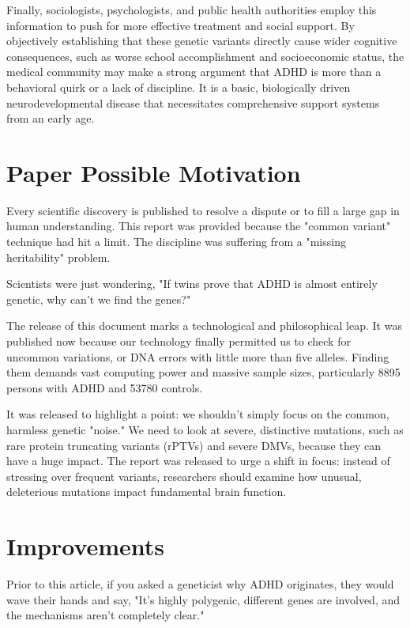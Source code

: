 Finally, sociologists, psychologists, and public health authorities employ this information to push for more effective treatment and social support. 
By objectively establishing that these genetic variants directly cause wider cognitive consequences, such as worse school accomplishment and socioeconomic status, the medical community may make a strong argument that ADHD is more than a behavioral quirk or a lack of discipline. 
It is a basic, biologically driven neurodevelopmental disease that necessitates comprehensive support systems from an early age.  

\section{Paper Possible Motivation}  

Every scientific discovery is published to resolve a dispute or to fill a large gap in human understanding.  This report was provided because the "common variant" technique had hit a limit.  The discipline was suffering from a "missing heritability" problem.  

Scientists were just wondering, "If twins prove that ADHD is almost entirely genetic, why can't we find the genes?"  

The release of this document marks a technological and philosophical leap.  It was published now because our technology finally permitted us to check for uncommon variations, or DNA errors with little more than five alleles. 
Finding them demands vast computing power and massive sample sizes, particularly 8895 persons with ADHD and 53780 controls.  

It was released to highlight a point: we shouldn't simply focus on the common, harmless genetic "noise." We need to look at severe, distinctive mutations, such as rare protein truncating variants (rPTVs) and severe DMVs, because they can have a huge impact. 
The report was released to urge a shift in focus: instead of stressing over frequent variants, researchers should examine how unusual, deleterious mutations impact fundamental brain function.  

\section{Improvements}  

Prior to this article, if you asked a geneticist why ADHD originates, they would wave their hands and say, "It's highly polygenic, different genes are involved, and the mechanisms aren't completely clear."  

